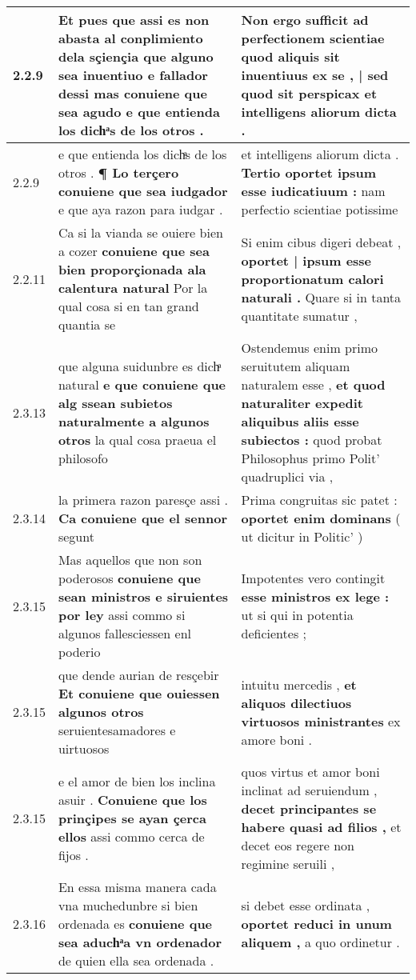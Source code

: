 \begin{tabular}{|p{1cm}|p{6.5cm}|p{6.5cm}|}
2.2.9 & Et pues que assi es non abasta al conplimiento dela sçiençia \textbf{ que alguno sea inuentiuo e fallador dessi mas conuiene que sea agudo } e que entienda los dichͣs de los otros . & Non ergo sufficit ad perfectionem scientiae \textbf{ quod aliquis sit inuentiuus ex se , | sed quod sit perspicax } et intelligens aliorum dicta . \\\hline
2.2.9 & e que entienda los dichͣs de los otros . \textbf{ ¶ Lo terçero conuiene que sea iudgador } e que aya razon para iudgar . & et intelligens aliorum dicta . \textbf{ Tertio oportet ipsum esse iudicatiuum : } nam perfectio scientiae potissime \\\hline
2.2.11 & Ca si la vianda se ouiere bien a cozer \textbf{ conuiene que sea bien proporçionada ala calentura natural } Por la qual cosa si en tan grand quantia se & Si enim cibus digeri debeat , \textbf{ oportet | ipsum esse proportionatum calori naturali . } Quare si in tanta quantitate sumatur , \\\hline
2.3.13 & que alguna suidunbre es dichͣ natural \textbf{ e que conuiene que alg ssean subietos naturalmente a algunos otros } la qual cosa praeua el philosofo & Ostendemus enim primo seruitutem aliquam naturalem esse , \textbf{ et quod naturaliter expedit aliquibus aliis esse subiectos : } quod probat Philosophus primo Polit’ quadruplici via , \\\hline
2.3.14 & la primera razon paresçe assi . \textbf{ Ca conuiene que el sennor } segunt & Prima congruitas sic patet : \textbf{ oportet enim dominans } ( ut dicitur in Politic’ ) \\\hline
2.3.15 & Mas aquellos que non son poderosos \textbf{ conuiene que sean ministros e siruientes por ley } assi commo si algunos fallesciessen enl poderio & Impotentes vero contingit \textbf{ esse ministros ex lege : } ut si qui in potentia deficientes ; \\\hline
2.3.15 & que dende aurian de resçebir \textbf{ Et conuiene que ouiessen algunos otros } seruientesamadores e uirtuosos & intuitu mercedis , \textbf{ et aliquos dilectiuos virtuosos ministrantes } ex amore boni . \\\hline
2.3.15 & e el amor de bien los inclina asuir . \textbf{ Conuiene que los prinçipes se ayan çerca ellos } assi commo cerca de fijos . & quos virtus et amor boni inclinat ad seruiendum , \textbf{ decet principantes se habere quasi ad filios , } et decet eos regere non regimine seruili , \\\hline
2.3.16 & En essa misma manera cada vna muchedunbre si bien ordenada es \textbf{ conuiene que sea aduchͣa vn ordenador } de quien ella sea ordenada . & si debet esse ordinata , \textbf{ oportet reduci in unum aliquem , } a quo ordinetur . \\\hline

\end{tabular}
